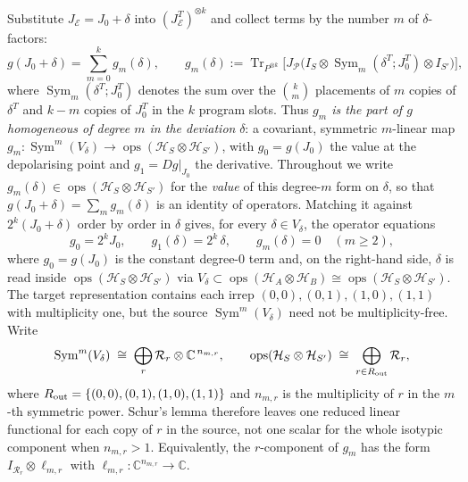\documentclass[11pt]{article}
\newcommand{\Tr}{\operatorname{Tr}}
\newcommand{\HH}{\mathcal{H}}
\newcommand{\cP}{\mathcal{P}}
\newcommand{\cE}{\mathcal{E}}
\newcommand{\ox}{\otimes}
\begin{document}
Substitute $J_\cE=J_0+\delta$ into $(J_\cE^T)^{\ox k}$ and collect terms by the number $m$ of
$\delta$-factors:
\begin{equation}\label{eq:gm}
g(J_0+\delta)=\sum_{m=0}^{k}g_m(\delta),\qquad
g_m(\delta):=\Tr_{P^{\ox k}}\!\Big[J_\cP\big(I_S\ox\operatorname{Sym}_m(\delta^T;J_0^T)\ox I_{S'}\big)\Big],
\end{equation}
where $\operatorname{Sym}_m(\delta^T;J_0^T)$ denotes the sum over the $\binom{k}{m}$ placements
of $m$ copies of $\delta^T$ and $k-m$ copies of $J_0^T$ in the $k$ program slots. Thus
\emph{$g_m$ is the part of $g$ homogeneous of degree $m$ in the deviation} $\delta$: a
covariant, symmetric $m$-linear map
$g_m:\operatorname{Sym}^m(V_\delta)\to\operatorname{ops}(\HH_S\ox\HH_{S'})$, with
$g_0=g(J_0)$ the value at the depolarising point and $g_1=Dg|_{J_0}$ the derivative.
Throughout we write $g_m(\delta)\in\operatorname{ops}(\HH_S\ox\HH_{S'})$ for the \emph{value}
of this degree-$m$ form on $\delta$, so that $g(J_0+\delta)=\sum_{m}g_m(\delta)$ is an
identity of operators. Matching it against $2^k(J_0+\delta)$ order by order in $\delta$
gives, for every $\delta\in V_\delta$, the operator equations
\begin{equation}\label{eq:gorders}
g_0=2^k J_0,\qquad g_1(\delta)=2^k\,\delta,\qquad g_m(\delta)=0\quad(m\ge2),
\end{equation}
where $g_0=g(J_0)$ is the constant degree-$0$ term and, on the right-hand side, $\delta$ is
read inside $\operatorname{ops}(\HH_S\ox\HH_{S'})$ via
$V_\delta\subset\operatorname{ops}(\HH_A\ox\HH_B)\cong\operatorname{ops}(\HH_S\ox\HH_{S'})$.
The target representation contains each irrep
$(0,0),(0,1),(1,0),(1,1)$ with multiplicity one, but the source
$\operatorname{Sym}^m(V_\delta)$ need not be multiplicity-free. Write
\begin{equation}\label{eq:symmult}
\operatorname{Sym}^m(V_\delta)
\;\cong\;\bigoplus_{r}\mathcal R_r\ox \mathbb C^{\,n_{m,r}},
\qquad
\operatorname{ops}(\HH_S\ox\HH_{S'})
\;\cong\;\bigoplus_{r\in R_{\rm out}}\mathcal R_r,
\end{equation}
where $R_{\rm out}=\{(0,0),(0,1),(1,0),(1,1)\}$ and $n_{m,r}$ is the multiplicity of
$r$ in the $m$-th symmetric power. Schur's lemma therefore leaves one reduced linear
functional for each copy of $r$ in the source, not one scalar for the whole isotypic
component when $n_{m,r}>1$. Equivalently, the $r$-component of $g_m$ has the form
$I_{\mathcal R_r}\ox \ell_{m,r}$ with
$\ell_{m,r}:\mathbb C^{n_{m,r}}\to\mathbb C$.
\end{document}
